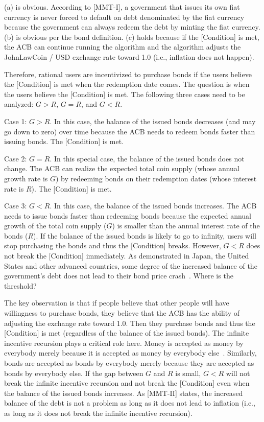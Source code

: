 \documentclass[dvipdfmx,a4paper]{article}
\begin{document}
(a) is obvious. According to [MMT-I], a government that issues its own fiat currency is never forced to default on debt denominated by the fiat currency because the government can always redeem the debt by minting the fiat currency. (b) is obvious per the bond definition. (c) holds because if the [Condition] is met, the ACB can continue running the algorithm and the algorithm adjusts the JohnLawCoin / USD exchange rate toward 1.0 (i.e., inflation does not happen).

Therefore, rational users are incentivized to purchase bonds if the users believe the [Condition] is met when the redemption date comes. The question is when the users believe the [Condition] is met. The following three cases need to be analyzed: $G>R$, $G=R$, and $G<R$.

Case 1: $G>R$. In this case, the balance of the issued bonds decreases (and may go down to zero) over time because the ACB needs to redeem bonds faster than issuing bonds. The [Condition] is met.

Case 2: $G=R$. In this special case, the balance of the issued bonds does not change. The ACB can realize the expected total coin supply (whose annual growth rate is $G$) by redeeming bonds on their redemption dates (whose interest rate is $R$). The [Condition] is met.

Case 3: $G<R$. In this case, the balance of the issued bonds increases. The ACB needs to issue bonds faster than redeeming bonds because the expected annual growth of the total coin supply ($G$) is smaller than the annual interest rate of the bonds ($R$). If the balance of the issued bonds is likely to go to infinity, users will stop purchasing the bonds and thus the [Condition] breaks. However, $G<R$ does not break the [Condition] immediately. As demonstrated in Japan, the United States and other advanced countries, some degree of the increased balance of the government's debt does not lead to their bond price crash~\cite{elmendorf1999government}. Where is the threshold?

The key observation is that if people believe that other people will have willingness to purchase bonds, they believe that the ACB has the ability of adjusting the exchange rate toward 1.0. Then they purchase bonds and thus the [Condition] is met (regardless of the balance of the issued bonds). The infinite incentive recursion plays a critical role here. Money is accepted as money by everybody merely because it is accepted as money by everybody else~\cite{iwai1996boostrap,iwai1997evolution}. Similarly, bonds are accepted as bonds by everybody merely because they are accepted as bonds by everybody else. If the gap between $G$ and $R$ is small, $G<R$ will not break the infinite incentive recursion and not break the [Condition] even when the balance of the issued bonds increases. As [MMT-II] states, the increased balance of the debt is not a problem as long as it does not lead to inflation (i.e., as long as it does not break the infinite incentive recursion).
\end{document}
